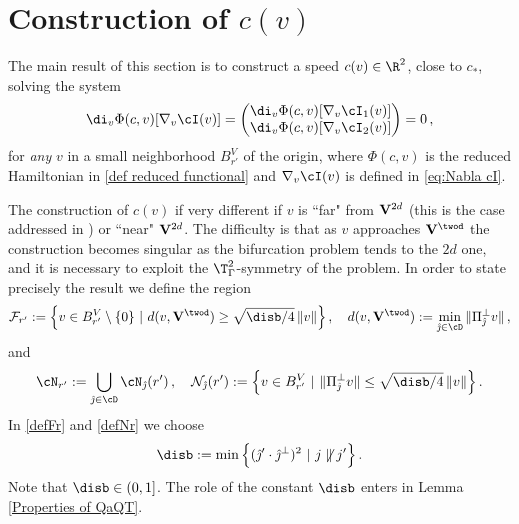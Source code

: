 \documentclass[11pt,a4paper,reqno]{article}
\numberwithin{equation}{section}
\theoremstyle{definition}
\begin{document}
\section{Construction of $ c(v) $}\label{sec:cv}


The main result of  this section is to   construct a  speed 
$ c(v) \in \R^2 $, close to 
$ c_* $, solving 
the system 
\begin{equation}\label{EQ c Phi}
\di_v \Phi (c, v) [\nabla_v \cI (v)] = 
        \begin{pmatrix}
        \di_v \Phi (c, v) [\nabla_v \cI_1 (v)]   \\
        \di_v \Phi (c, v) [\nabla_v \cI_2 (v)] 
        \end{pmatrix} = 0
\, , 
\end{equation}
for {\it any} $ v $ in  a 
small neighborhood  $ B_{r'}^V $
of the origin, 
        where $\Phi(c,v)$ is the reduced Hamiltonian  in \eqref{def reduced functional} and $\nabla_v \cI (v) $ is defined in \eqref{eq:Nabla cI}.

\smallskip

The construction of $ c (v) $ if very different if 
$ v $ is ``far" from $  {\bf V}^{2d}$ (this is the case addressed in \cite{CN}) or    
``near" $  {\bf V}^{2d}$. 
The difficulty is that as $ v $
 approaches  $ {\bf V}^{\twod} $ the construction
 becomes singular  as the bifurcation problem tends to the $2d$ one, and 
it is necessary to exploit the $ \T^2_\Gamma$-symmetry of the problem.
In order to state precisely the result we define  the region 
\begin{equation}\label{defFr}
{\mathcal F}_{r'} := \Big\{ 
        v\in B_{r'}^V\setminus\{0\} \ | \  
        d(v,{\bf V}^{\twod}) \geq \sqrt{\disb/4}\, \|v\|
        \Big\} \, ,\quad 
        d(v, {\bf V}^{\twod}) := \min_{{\hat \jmath} \in \cD} \| \Pi_{\hat \jmath}^\bot v \| \, , 
\end{equation}
and  
\begin{equation}\label{defNr}
\cN_{r'} :=\bigcup_{\hat \jmath\in\cD} \cN_{\hat \jmath}(r') \, , \quad
{\mathcal N}_{\hat \jmath}(r')  := \Big\{ 
        v\in B_{r'}^V \ | \  
        \|\Pi_{\hat \jmath}^\bot v\| \leq \sqrt{\disb/4}\, \|v\|
        \Big\}  \, . 
\end{equation}
In \eqref{defFr}
and \eqref{defNr} we choose 
    \begin{equation}\label{eq:def b}    
        \disb:=
        \min \Big\{(\hat\jmath'\cdot \hat\jmath^\bot)^2 \ | \ j\not\parallel j' \Big\} \, .
    \end{equation}
    Note that $\disb\in (0,1]$.
    The  role of the constant $ \disb $ enters in Lemma \ref{Properties of QaQT}.
\end{document}
